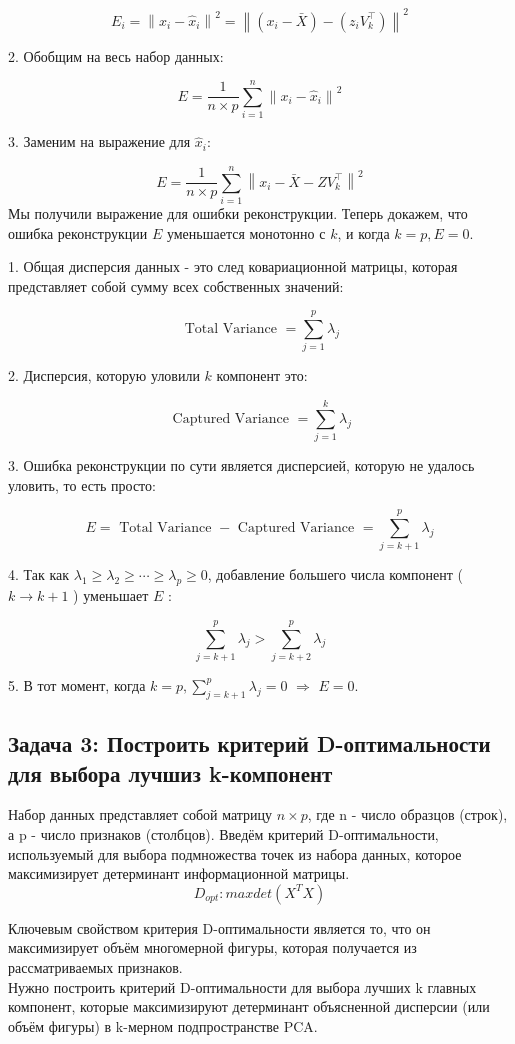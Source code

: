 $$
E_i=\left\|x_i-\hat{x}_i\right\|^2=\left\|\left(x_i-\bar{X}\right)-\left(z_i V_k^{\top}\right)\right\|^2
$$

2. Обобщим на весь набор данных:

$$
E=\frac{1}{n \times p} \sum_{i=1}^n\left\|x_i-\hat{x}_i\right\|^2
$$

3. Заменим на выражение для $\hat{x}_i$:

$$
E=\frac{1}{n \times p} \sum_{i=1}^n\left\|x_i-\bar{X}-Z V_k^{\top}\right\|^2
$$
Мы получили выражение для ошибки реконструкции. Теперь докажем, что 
ошибка реконструкции $E$ уменьшается монотонно с $k$, и когда $k=p, E=0$.

1. Общая дисперсия данных - это след ковариационной матрицы, которая представляет собой сумму всех собственных значений:

$$
\text { Total Variance }=\sum_{j=1}^p \lambda_j
$$

2. Дисперсия, которую уловили $k$ компонент это:

$$
\text { Captured Variance }=\sum_{j=1}^k \lambda_j
$$

3. Ошибка реконструкции по сути является дисперсией, которую не удалось уловить, то есть просто:

$$
E=\text { Total Variance }- \text { Captured Variance }=\sum_{j=k+1}^p \lambda_j
$$

4. Так как $\lambda_1 \geq \lambda_2 \geq \cdots \geq \lambda_p \geq 0$, добавление большего числа компонент ( $k \rightarrow k+1$ ) уменьшает $E$ :

$$
\sum_{j=k+1}^p \lambda_j>\sum_{j=k+2}^p \lambda_j
$$

5. В тот момент, когда $k=p, \sum_{j=k+1}^p \lambda_j=0$ $\Rightarrow$ $E=0$.

\subsection{Задача 3: Построить критерий D-оптимальности для выбора лучшиз k-компонент }
Набор данных представляет собой матрицу $n \times p$, где n - число образцов (строк), а p - число признаков (столбцов). Введём критерий D-оптимальности, используемый для выбора подмножества точек из набора данных, которое максимизирует детерминант информационной матрицы.
$$
D_{opt} : max  det(X^{T}X)
$$

Ключевым свойством критерия D-оптимальности является то, что он максимизирует объём многомерной фигуры, которая получается из рассматриваемых признаков. \\
Нужно построить критерий D-оптимальности для выбора лучших 
k главных компонент, которые максимизируют детерминант объясненной дисперсии (или объём фигуры) в k-мерном подпространстве PCA. 

